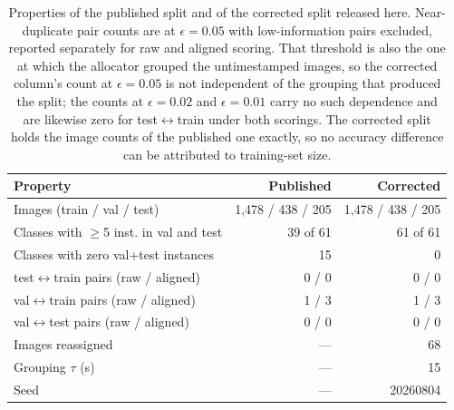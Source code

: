 \begin{table}[t]
  \centering
  \caption{Properties of the published split and of the corrected split released here. Near-duplicate pair counts are at $\epsilon = 0.05$ with low-information pairs excluded, reported separately for raw and aligned scoring. That threshold is also the one at which the allocator grouped the untimestamped images, so the corrected column's count at $\epsilon = 0.05$ is not independent of the grouping that produced the split; the counts at $\epsilon = 0.02$ and $\epsilon = 0.01$ carry no such dependence and are likewise zero for test$\leftrightarrow$train under both scorings. The corrected split holds the image counts of the published one exactly, so no accuracy difference can be attributed to training-set size.}
  \label{tab:split-properties}
  \begin{tabular}{lrr}
    \toprule
    Property & Published & Corrected \\
    \midrule
    Images (train / val / test) & 1,478 / 438 / 205 & 1,478 / 438 / 205 \\
    Classes with $\geq$5 inst. in val and test & 39 of 61 & 61 of 61 \\
    Classes with zero val+test instances & 15 & 0 \\
    test$\leftrightarrow$train pairs (raw / aligned) & 0 / 0 & 0 / 0 \\
    val$\leftrightarrow$train pairs (raw / aligned) & 1 / 3 & 1 / 3 \\
    val$\leftrightarrow$test pairs (raw / aligned) & 0 / 0 & 0 / 0 \\
    Images reassigned & --- & 68 \\
    Grouping $\tau$ (s) & --- & 15 \\
    Seed & --- & 20260804 \\
    \bottomrule
  \end{tabular}
\end{table}
